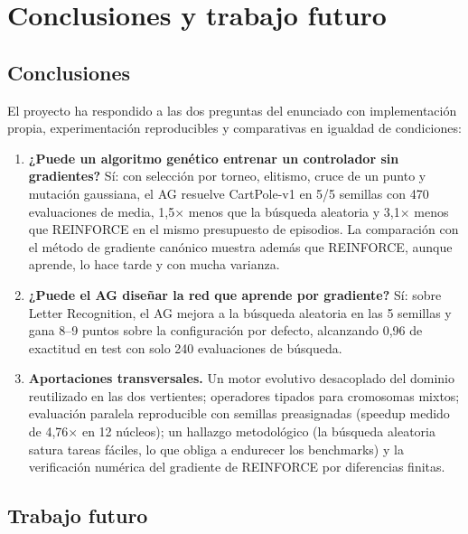\section{Conclusiones y trabajo futuro}
\label{sec:conclusiones}

\subsection{Conclusiones}

El proyecto ha respondido a las dos preguntas del enunciado con implementación propia, experimentación reproducibles y comparativas en igualdad de condiciones:

\begin{enumerate}
  \item \textbf{¿Puede un algoritmo genético entrenar un controlador sin gradientes?} Sí: con selección por torneo, elitismo, cruce de un punto y mutación gaussiana, el AG resuelve CartPole-v1 en 5/5 semillas con 470 evaluaciones de media, 1,5$\times$ menos que la búsqueda aleatoria y 3,1$\times$ menos que REINFORCE en el mismo presupuesto de episodios. La comparación con el método de gradiente canónico muestra además que REINFORCE, aunque aprende, lo hace tarde y con mucha varianza.
  \item \textbf{¿Puede el AG diseñar la red que aprende por gradiente?} Sí: sobre Letter Recognition, el AG mejora a la búsqueda aleatoria en las 5 semillas y gana 8--9 puntos sobre la configuración por defecto, alcanzando 0,96 de exactitud en test con solo 240 evaluaciones de búsqueda.
  \item \textbf{Aportaciones transversales.} Un motor evolutivo desacoplado del dominio reutilizado en las dos vertientes; operadores tipados para cromosomas mixtos; evaluación paralela reproducible con semillas preasignadas (speedup medido de 4,76$\times$ en 12 núcleos); un hallazgo metodológico (la búsqueda aleatoria satura tareas fáciles, lo que obliga a endurecer los benchmarks) y la verificación numérica del gradiente de REINFORCE por diferencias finitas.
\end{enumerate}

\subsection{Trabajo futuro}

